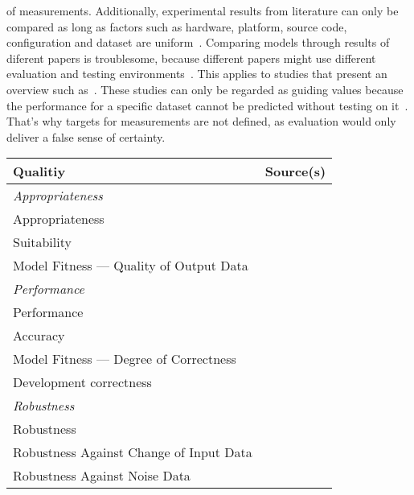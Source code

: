 of measurements.
Additionally, experimental results from literature can only be compared as long as factors such as
hardware, platform, source code, configuration and dataset are uniform~\citep{arpteg_software_2018}.
Comparing models through results of diferent papers is troublesome, because different papers
might use different evaluation and testing environments~\citep{baek_what_2019}.
This applies to studies that present an overview such as~\cite{chen_text_2021,long_scene_2021}.
These studies can only be regarded as guiding values because the performance for a specific dataset
cannot be predicted without testing on it~\cite{arpteg_software_2018}.
That's why targets for measurements are not defined, as evaluation would only deliver a false
sense of certainty.

\begin{table}[h]\label{tb:LiteratureQualitiesModel}
    \centering\scriptsize
    \begin{tabular}{p{} p{}}
        \textbf{Qualitiy} & \textbf{Source(s)} \\
        \toprule
        \textit{Appropriateness} \\
        Appropriateness &~\cite{siebert_construction_2021} \\
        Suitability &~\cite{siebert_construction_2021} \\
        Model Fitness --- Quality of Output Data &~\cite{nakamichi_requirements-driven_2020} \\
        \midrule
        \textit{Performance} \\
        Performance &~\cite{ashmore_assuring_2021,vogelsang_requirements_2019} \\
        Accuracy &~\cite{nakamichi_requirements-driven_2020} \\
        Model Fitness --- Degree of Correctness &~\cite{nakamichi_requirements-driven_2020,
                                                    zhang_machine_2020} \\
        Development correctness &~\cite{siebert_construction_2021} \\
        \midrule
        \textit{Robustness} \\
        Robustness &~\cite{ashmore_assuring_2021, hu_towards_2020, siebert_construction_2021} \\
        Robustness Against Change of Input Data &~\cite{nakamichi_requirements-driven_2020} \\
        Robustness Against Noise Data &~\cite{nakamichi_requirements-driven_2020} \\

\end{tabular}
\end{table}
